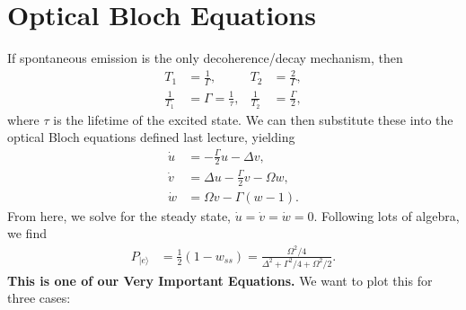 \documentclass[a4paper, 11pt, normalem]{report}
\begin{document}
\section{Optical Bloch Equations}
If spontaneous emission is the only decoherence/decay mechanism, then
\begin{align}
    T_1 &= \frac{1}{\Gamma}, & T_2 &= \frac2\Gamma, \\
    \frac{1}{T_1} &= \Gamma = \frac1\tau, & \frac1{T_2} &= \frac{\Gamma}{2},
\end{align}
where $\tau$ is the lifetime of the excited state.
We can then substitute these into the optical Bloch equations defined last lecture, yielding
\begin{align}
    \dot{u} &= -\frac{\Gamma}{2}u - \Delta v, \\
    \dot{v} &= \Delta u - \frac{\Gamma}{2}v - \Omega w, \\
    \dot{w} &= \Omega v - \Gamma(w-1).
\end{align}
From here, we solve for the steady state, $\dot u = \dot v = \dot w = 0.$
Following lots of algebra, we find
\begin{align}
    P_{|e\rangle} &= \frac12\left(1-w_{ss}\right) = \frac{\Omega^2/4}{\Delta^2 + \Gamma^2/4 + \Omega^2/2}.
\end{align}
\textbf{This is one of our Very Important Equations.}
We want to plot this for three cases:
\end{document}
